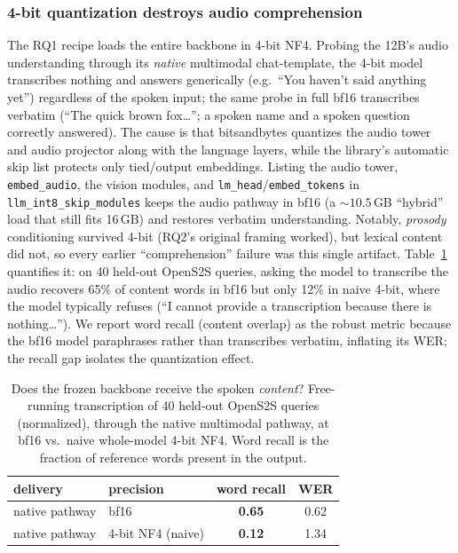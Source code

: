 \documentclass[11pt]{article}
\begin{document}
\subsubsection{4-bit quantization destroys audio comprehension}
\label{sec:quant}
The RQ1 recipe loads the entire backbone in 4-bit NF4. Probing the 12B's audio
understanding through its \emph{native} multimodal chat-template, the 4-bit model
transcribes nothing and answers generically (e.g.\ ``You haven't said anything
yet'') regardless of the spoken input; the same probe in full bf16 transcribes
verbatim (``The quick brown fox\ldots''; a spoken name and a spoken question
correctly answered). The cause is that bitsandbytes quantizes the audio tower and
audio projector along with the language layers, while the library's automatic
skip list protects only tied/output embeddings. Listing the audio tower,
\texttt{embed\_audio}, the vision modules, and \texttt{lm\_head}/\texttt{embed\_tokens}
in \texttt{llm\_int8\_skip\_modules} keeps the audio pathway in bf16 (a ${\sim}10.5$\,GB
``hybrid'' load that still fits 16\,GB) and restores verbatim understanding.
Notably, \emph{prosody} conditioning survived 4-bit (RQ2's original framing
worked), but lexical content did not, so every earlier ``comprehension'' failure
was this single artifact. Table~\ref{tab:quant} quantifies it: on 40 held-out
OpenS2S queries, asking the model to transcribe the audio recovers 65\% of content
words in bf16 but only 12\% in naive 4-bit, where the model typically refuses
(``I cannot provide a transcription because there is nothing\ldots''). We report
word recall (content overlap) as the robust metric because the bf16 model
paraphrases rather than transcribes verbatim, inflating its WER; the recall gap
isolates the quantization effect.

\begin{table}[tbp]\centering
\caption{Does the frozen backbone receive the spoken \emph{content}? Free-running
transcription of 40 held-out OpenS2S queries (normalized), through the native
multimodal pathway, at bf16 vs.\ naive whole-model 4-bit NF4. Word recall is the
fraction of reference words present in the output.}
\label{tab:quant}
\begin{tabular}{llcc}\toprule
delivery & precision & word recall & WER \\ \midrule
native pathway & bf16 & \textbf{0.65} & 0.62 \\
native pathway & 4-bit NF4 (naive) & \textbf{0.12} & 1.34 \\ \bottomrule
\end{tabular}
\end{table}
\end{document}
